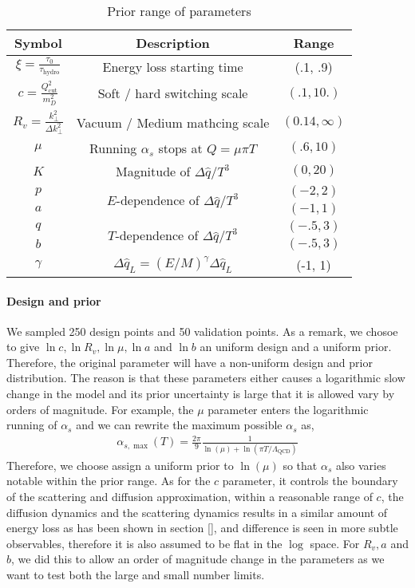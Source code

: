 \begin{table}
\centering
\caption{Prior range of parameters}\label{table:new:prior}
\begin{tabular}{ccc}
\hline
Symbol & Description & Range \\
\hline
$\xi = \frac{\tau_0}{\tau_{\textrm{hydro}}}$ & Energy loss starting time & (.1, .9) \\
$c = \frac{Q_{\textrm{cut}}^2}{m_D^2}$ & Soft / hard switching scale & $(.1, 10.)$ \\
$R_v = \frac{k_\perp^2}{\Delta k_\perp^2}$ & Vacuum / Medium mathcing scale & $(0.14, \infty)$\\
$\mu$ & Running $\alpha_s$ stops at $Q = \mu\pi T$ & $(.6, 10)$ \\
$K$ & Magnitude of $\Delta \hat{q}/T^3$ & $(0, 20)$\\ 
$p$ & \multirow{2}{*}{$E$-dependence of $\Delta \hat{q}/T^3$} & $(-2, 2)$\\ 
$a$ &  & $(-1, 1)$\\ 
$q$ & \multirow{2}{*}{$T$-dependence of $\Delta \hat{q}/T^3$}  & $(-.5, 3)$\\ 
$b$ &   & $(-.5, 3)$\\ 
$\gamma$ & $\Delta \hat{q}_L = (E/M)^\gamma\Delta \hat{q}_L$  & (-1, 1)\\ 
\hline
\end{tabular}
\end{table}

\paragraph{Design and prior} We sampled 250 design points and 50 validation points. 
As a remark, we chosoe to give $\ln c, \ln R_v, \ln \mu, \ln a$ and $\ln b$ an uniform design and a uniform prior.
Therefore, the original parameter will have a non-uniform design and prior distribution.
The reason is that these parameters either causes a logarithmic slow change in the model and its prior uncertainty is large that it is allowed vary by orders of magnitude.
For example, the $\mu$ parameter enters the logarithmic running of $\alpha_s$ and we can rewrite the maximum possible $\alpha_s$ as,
\begin{eqnarray}
\alpha_{s,\max}(T) = \frac{2\pi}{9}\frac{1}{\ln(\mu) + \ln(\pi T/\Lambda_{\textrm{QCD}})}
\end{eqnarray}
Therefore, we choose assign a uniform prior to $\ln(\mu)$ so that $\alpha_s$ also varies notable within the prior range.
As for the $c$ parameter, it controls the boundary of the scattering and diffusion approximation, within a reasonable range of $c$, the diffusion dynamics and the scattering dynamics results in a similar amount of energy loss as has been shown in section [], and difference is seen in more subtle observables, therefore it is also assumed to be flat in the $\log$ space.
For $R_v, a$ and $b$, we did this to allow an order of magnitude change in the parameters as we want to test both the large and small number limits.

